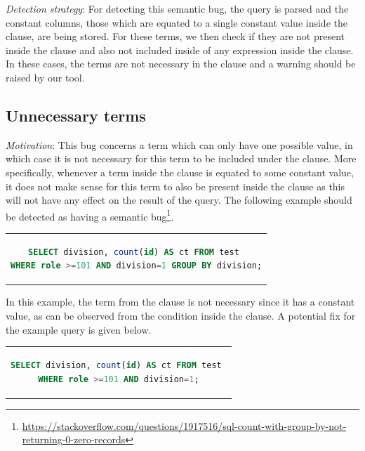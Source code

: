 \noindent \emph{Detection strategy}: For detecting this semantic bug, the query is parsed and the constant columns, those which are equated to a single constant value inside the  clause, are being stored. For these terms, we then check if they are not present inside the  clause and also not included inside of any  expression inside the  clause. In these cases, the terms are not necessary in the  clause and a warning should be raised by our tool.

\subsection{Unnecessary  terms}
\emph{Motivation}: This bug concerns a  term which can only have one possible value, in which case it is not necessary for this term to be included under the  clause. More specifically, whenever a term inside the  clause is equated to some constant value, it does not make sense for this term to also be present inside the  clause as this will not have any effect on the result of the query. The following example should be detected as having a semantic bug\footnote{\url{https://stackoverflow.com/questions/1917516/sql-count-with-group-by-not-returning-0-zero-records}}.

\begin{center}
\begin{tabular}{c}
\begin{lstlisting}[language=SQL]
SELECT division, count(id) AS ct FROM test 
WHERE role >=101 AND division=1 GROUP BY division;
\end{lstlisting}
\end{tabular}
\end{center}

In this example, the  term from the  clause is not necessary since it has a constant value, as can be observed from the  condition inside the  clause. A potential fix for the example query is given below.

\begin{center}
\begin{tabular}{c}
\begin{lstlisting}[language=SQL]
SELECT division, count(id) AS ct FROM test 
WHERE role >=101 AND division=1;
\end{lstlisting}
\end{tabular}
\end{center}

